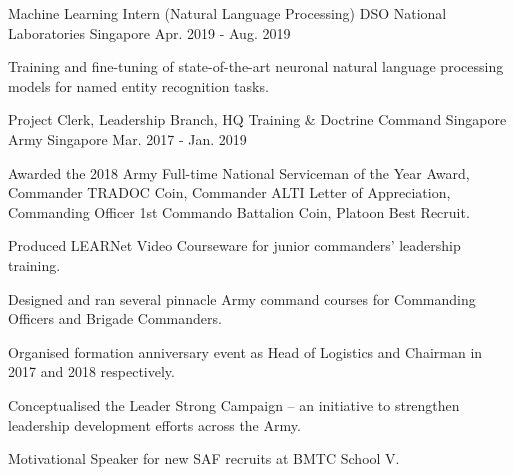 

\begin{cventries}

  \cventry
    {Machine Learning Intern (Natural Language Processing)} %
    {DSO National Laboratories} %
    {Singapore} %
    {Apr. 2019 - Aug. 2019} %
    {
      \begin{cvitems} %
        \item {Training and fine-tuning of state-of-the-art neuronal natural language processing models for named entity recognition tasks.}
      \end{cvitems}
    }
    
  \cventry
    {Project Clerk, Leadership Branch, HQ Training \& Doctrine Command} %
    {Singapore Army} %
    {Singapore} %
    {Mar. 2017 - Jan. 2019} %
    {
      \begin{cvitems} %
        \item {Awarded the 2018 Army Full-time National Serviceman of the Year Award, Commander TRADOC Coin, Commander ALTI Letter of Appreciation, Commanding Officer 1st Commando Battalion Coin, Platoon Best Recruit.}
        \item {Produced LEARNet Video Courseware for junior commanders' leadership training.}
        \item {Designed and ran several pinnacle Army command courses for Commanding Officers and Brigade Commanders.}
        \item {Organised formation anniversary event as Head of Logistics and Chairman in 2017 and 2018 respectively.}
        \item {Conceptualised the Leader Strong Campaign – an initiative to strengthen leadership development efforts across the Army.}
        \item {Motivational Speaker for new SAF recruits at BMTC School V.}
      \end{cvitems}
    }


\end{cventries}

